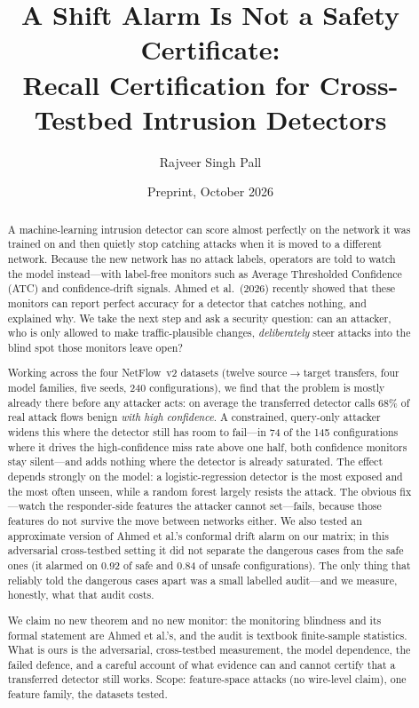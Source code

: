 \documentclass[11pt]{article}
\title{\bfseries A Shift Alarm Is Not a Safety Certificate:\\ Recall Certification for Cross-Testbed Intrusion Detectors}
\author{Rajveer Singh Pall}
\date{Preprint, October 2026}
\begin{document}
\maketitle

\begin{abstract}
A machine-learning intrusion detector can score almost perfectly on the network it was trained on and then quietly stop catching attacks when it is moved to a different network. Because the new network has no attack labels, operators are told to watch the model instead---with label-free monitors such as Average Thresholded Confidence (ATC) and confidence-drift signals. Ahmed et al.\ (2026) recently showed that these monitors can report perfect accuracy for a detector that catches nothing, and explained why. We take the next step and ask a security question: can an attacker, who is only allowed to make traffic-plausible changes, \emph{deliberately} steer attacks into the blind spot those monitors leave open?

Working across the four NetFlow~v2 datasets (twelve source$\to$target transfers, four model families, five seeds, 240 configurations), we find that the problem is mostly already there before any attacker acts: on average the transferred detector calls 68\% of real attack flows benign \emph{with high confidence}. A constrained, query-only attacker widens this where the detector still has room to fail---in 74 of the 145 configurations where it drives the high-confidence miss rate above one half, both confidence monitors stay silent---and adds nothing where the detector is already saturated. The effect depends strongly on the model: a logistic-regression detector is the most exposed and the most often unseen, while a random forest largely resists the attack. The obvious fix---watch the responder-side features the attacker cannot set---fails, because those features do not survive the move between networks either. We also tested an approximate version of Ahmed et al.'s conformal drift alarm on our matrix; in this adversarial cross-testbed setting it did not separate the dangerous cases from the safe ones (it alarmed on 0.92 of safe and 0.84 of unsafe configurations). The only thing that reliably told the dangerous cases apart was a small labelled audit---and we measure, honestly, what that audit costs.

We claim no new theorem and no new monitor: the monitoring blindness and its formal statement are Ahmed et al.'s, and the audit is textbook finite-sample statistics. What is ours is the adversarial, cross-testbed measurement, the model dependence, the failed defence, and a careful account of what evidence can and cannot certify that a transferred detector still works. Scope: feature-space attacks (no wire-level claim), one feature family, the datasets tested.
\end{abstract}
\end{document}
